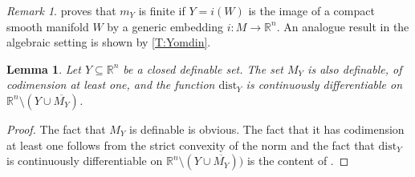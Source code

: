 \documentclass{amsart}
\newcommand{\R}{\mathbb{R}}
\newcommand{\dd}{\mathrm{dist}}
\newtheorem{lemma}[subsubsection]{Lemma}
\theoremstyle{definition}
\theoremstyle{remark}
\newtheorem{remark}[subsubsection]{Remark}
\begin{document}
\begin{remark}
\cite[Prop.\ 3]{Yomdin1981} proves that $m_Y$ is finite if $Y = i(W)$ is the image of a  compact smooth manifold $W$ by a generic embedding $i \colon M \to \R^n$. An analogue result in the algebraic setting is shown by \cref{T:Yomdin}. 
\end{remark}


\begin{lemma}
\label{L:useful}
Let $Y \subseteq \R^n$ be a closed definable set. The set $M_Y$ is also definable, of codimension at least one, and the function $\dd_Y$ is continuously differentiable on $\R^n \setminus (Y \cup \overline {M_Y})$.
\end{lemma}

\begin{proof}The fact that $M_Y$ is definable is obvious. The fact that it has codimension at least one follows from the strict convexity of the norm and the fact that $\dd_Y$ is continuously differentiable on $\R^n \setminus (Y \cup \overline {M_Y}))$ is the content of \cite[Theorem 4.8(5)]{Federer1959}.
\end{proof}
\end{document}
